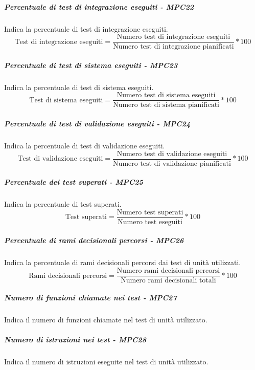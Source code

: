 \subparagraph{Percentuale di test di integrazione eseguiti - MPC22}
Indica la percentuale di test di integrazione eseguiti.
\begin{equation*}
\text{Test di integrazione eseguiti} = \frac{\text{Numero test di integrazione eseguiti}}{\text{Numero test di integrazione pianificati}} * 100
\end{equation*}
\subparagraph{Percentuale di test di sistema eseguiti - MPC23}
Indica la percentuale di test di sistema eseguiti.
\begin{equation*}
\text{Test di sistema eseguiti} = \frac{\text{Numero test di sistema eseguiti}}{\text{Numero test di sistema pianificati}} * 100
\end{equation*}
\subparagraph{Percentuale di test di validazione eseguiti - MPC24}
Indica la percentuale di test di validazione eseguiti.
\begin{equation*}
\text{Test di validazione eseguiti} = \frac{\text{Numero test di validazione eseguiti}}{\text{Numero test di validazione pianificati}} * 100
\end{equation*}
\subparagraph{Percentuale dei test superati - MPC25}
Indica la percentuale di test superati.
\begin{equation*}
\text{Test superati} = \frac{\text{Numero test superati}}{\text{Numero test eseguiti}} * 100
\end{equation*}
\subparagraph{Percentuale di rami decisionali percorsi - MPC26}
Indica la percentuale di rami decisionali percorsi dai test di unità utilizzati.
\begin{equation*}
\text{Rami decisionali percorsi} = \frac{\text{Numero rami decisionali percorsi}}{\text{Numero rami decisionali totali}} * 100
\end{equation*}
\subparagraph{Numero di funzioni chiamate nei test - MPC27}
Indica il numero di funzioni chiamate nel test di unità utilizzato.
\subparagraph{Numero di istruzioni nei test - MPC28}
Indica il numero di istruzioni eseguite nel test di unità utilizzato.


